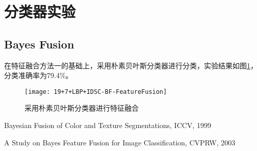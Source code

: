\section{分类器实验}
%

\subsection{Bayes Fusion}
在特征融合方法一的基础上，采用朴素贝叶斯分类器进行分类，实验结果如图\ref{fig:19+7+LBP+IDSC-BF-FeatureFusion}，分类准确率为79.4\%。
\begin{figure}[!ht]
\centering
\texttt{[image: 19+7+LBP+IDSC-BF-FeatureFusion]}
\caption{采用朴素贝叶斯分类器进行特征融合}
\label{fig:19+7+LBP+IDSC-BF-FeatureFusion}
\end{figure}

Bayesian Fusion of Color and Texture Segmentations, ICCV, 1999

A Study on Bayes Feature Fusion for Image Classification, CVPRW, 2003


